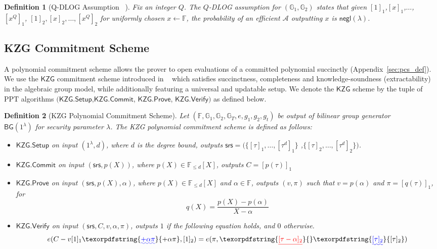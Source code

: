 \documentclass[sigconf]{acmart}
\newtheorem{definition}{Definition}[section]
\newcommand{\F}{\mathbb{F}}
\newcommand{\Gone}{\mathbb{G}_1}
\newcommand{\Gtwo}{\mathbb{G}_2}
\newcommand{\GT}{\mathbb{G}_T}
\newcommand{\srs}{\mathsf{srs}}
\newcommand{\gone}[1]{\ensuremath{\left[{#1}\right]_1}}
\newcommand{\gtwo}[1]{\ensuremath{\left[{#1}\right]_2}}
\newcommand{\Adv}{\ensuremath{\mathcal{A}}}
\newcommand{\kzg}{\ensuremath{\mathsf{KZG}}}
\newcommand{\eltone}[1]{[#1]_1}
\newcommand{\elttwo}[1]{[#1]_2}
\newcommand{\KZGsetup}{\mathsf{KZG.Setup}}
\newcommand{\KZGcommit}{\mathsf{KZG.Commit}}
\newcommand{\KZGopen}{\mathsf{KZG.Prove}}
\newcommand{\KZGverify}{\mathsf{KZG.Verify}}
\newcommand{\ppt}{\mathrm{PPT}}
\newcommand{\bg}{\ensuremath{\mathsf{BG}}}
\newcommand{\secp}{\ensuremath{\lambda}}
\newcommand{\negl}{\ensuremath{\mathsf{negl}}}
\providecommand{\DIFaddtex}[1]{{\protect\color{blue}\uwave{#1}}} %
\providecommand{\DIFdeltex}[1]{{\protect\color{red}\sout{#1}}}                      %
\providecommand{\DIFaddbegin}{} %
\providecommand{\DIFaddend}{} %
\providecommand{\DIFdelbegin}{} %
\providecommand{\DIFdelend}{} %
\providecommand{\DIFadd}[1]{\texorpdfstring{\DIFaddtex{#1}}{#1}} %
\providecommand{\DIFdel}[1]{\texorpdfstring{\DIFdeltex{#1}}{}} %
\newcommand{\DIFscaledelfig}{0.5}
\newlength{\DIFdelgraphicswidth} %
\newlength{\DIFdelgraphicsheight} %
\newcommand{\DIFaddincludegraphics}[2][]{{\color{blue}\fbox{\DIFOincludegraphics[#1]{#2}}}} %
\newcommand{\DIFdelincludegraphics}[2][]{%
	\sbox{\DIFdelgraphicsbox}{\DIFOincludegraphics[#1]{#2}}%
	\settoboxwidth{\DIFdelgraphicswidth}{\DIFdelgraphicsbox} %
	\settoboxtotalheight{\DIFdelgraphicsheight}{\DIFdelgraphicsbox} %
	\scalebox{\DIFscaledelfig}{%
		\parbox[b]{\DIFdelgraphicswidth}{\usebox{\DIFdelgraphicsbox}\\[-\baselineskip] \rule{\DIFdelgraphicswidth}{0em}}\llap{\resizebox{\DIFdelgraphicswidth}{\DIFdelgraphicsheight}{%
				\setlength{\unitlength}{\DIFdelgraphicswidth}%
				\begin{picture}(1,1)%
					\thicklines\linethickness{2pt} %
					{\color[rgb]{1,0,0}\put(0,0){\framebox(1,1){}}}%
					{\color[rgb]{1,0,0}\put(0,0){\line( 1,1){1}}}%
					{\color[rgb]{1,0,0}\put(0,1){\line(1,-1){1}}}%
				\end{picture}%
			}\hspace*{3pt}}} %
} %
\DeclareRobustCommand{\DIFaddbegin}{\DIFOaddbegin \let\includegraphics\DIFaddincludegraphics} %
\DeclareRobustCommand{\DIFaddend}{\DIFOaddend \let\includegraphics\DIFOincludegraphics} %
\DeclareRobustCommand{\DIFdelbegin}{\DIFOdelbegin \let\includegraphics\DIFdelincludegraphics} %
\DeclareRobustCommand{\DIFdelend}{\DIFOaddend \let\includegraphics\DIFOincludegraphics} %
\begin{document}
	\DIFaddend \begin{definition}[Q-DLOG Assumption ~\cite{C:FucKilLos18}]\label{defn:q-dlog}
		Fix an integer $Q$. The $Q$-DLOG assumption for $(\Gone,\Gtwo)$ states that given $\gone{1}$,$\gone{x}$,$\ldots$, \\
		$\gone{x^Q}$, $\gtwo{1},\gtwo{x},\ldots,\gtwo{x^Q}$ for
		uniformly chosen $x\gets \F$, the probability of an efficient $\Adv$ outputting $x$ is $\negl(\secp)$.
	\end{definition}
	
	
	\subsection{KZG Commitment Scheme}
	\label{sec:KZG}
	A polynomial commitment scheme allows the prover to open evaluations of a committed polynomial succinctly (Appendix~\ref{sec:pcs_def}).
	We use the $\kzg$ commitment scheme introduced in ~\cite{AC:KatZavGol10} which satisfies succinctness, completeness and knowledge-soundness (extractability)
	in the algebraic group model, while additionally featuring a universal and updatable setup. We denote the $\kzg$ scheme by the tuple of $\ppt$ algorithms $(\KZGsetup$,$\KZGcommit$, $\KZGopen$, $\KZGverify)$ as defined below.
	\begin{definition}[KZG Polynomial Commitment Scheme]
		Let $(\F,\Gone,\Gtwo,\GT, e, g_1, g_2, g_t)$ be output of bilinear group generator \\
		$\bg(1^\secp)$ for security parameter $\secp$.
		The KZG polynomial commitment scheme is defined as follows:
		\begin{itemize}[leftmargin=1em]
			\item $\KZGsetup$ on input $(1^\secp,d)$, where $d$ is the degree bound, outputs
			$\srs = (\{\eltone{\tau},\ldots,\eltone{\tau^d}\}$ ,$\{\elttwo{\tau},\ldots,\elttwo{\tau^d}\})$.
			\item $\KZGcommit$ on input $(\srs,p(X))$, where $p(X) \in \F_{\leq d}[X]$, outputs $C=\eltone{p(\tau)}$
			\item $\KZGopen$ on input $(\srs,p(X),\alpha)$, where $p(X) \in \F_{\leq d}[X]$ and $\alpha\in \F$, outputs $(v, \pi)$ such that $v=p(\alpha)$ and $\pi=\eltone{q(\tau)}$, for
			\[ q(X)=\frac{p(X)-p(\alpha)}{X-\alpha} \]
			\item $\KZGverify$ on input $(\srs,C,v, \alpha,\pi)$, outputs $1$ if the following equation holds, and $0$ otherwise.
			\[ e(C-v\eltone{1} \DIFaddbegin \DIFadd{+ \alpha\pi}\DIFaddend , \elttwo{1}) = e(\pi, \DIFdelbegin \DIFdel{\elttwo{\tau-\alpha}}\DIFdelend \DIFaddbegin \DIFadd{\elttwo{\tau}}\DIFaddend ) \]
			\DIFaddbegin 
			
			\DIFaddend \end{itemize}
	\end{definition}
	\DIFdelbegin %
	
\end{document}
